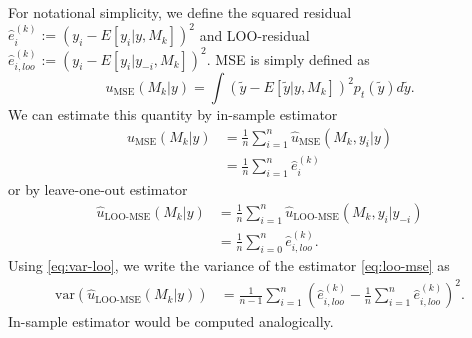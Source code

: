 \documentclass{article}
\newcommand{\residual}[2][i]{\hat{e}_{#1}^{(#2)}}
\begin{document}
For notational simplicity, we define the squared residual $\residual{k} := (y_i - E[y_i | y, M_k])^2$ and LOO-residual $\residual[i, loo]{k} := (y_i - E[y_i | y_{-i}, M_k])^2$. MSE is simply defined as
\begin{equation}
    u_{\text{MSE}}(M_k | y) = \int \left( \tilde{y} - E\left[ \tilde{y} | y, M_k \right] \right)^2 p_t(\tilde{y}) d\tilde{y}.
\end{equation}
We can estimate this quantity by in-sample estimator
\begin{align}
    \hat{u}_{\text{MSE}}(M_k | y) &= \frac{1}{n} \sum_{i=1}^n \hat{u}_{\text{MSE}}(M_k, y_i | y) \nonumber \\ 
    &= \frac{1}{n} \sum_{i=1}^n \residual{k}
\end{align}
or by leave-one-out estimator
\begin{align}
    \hat{u}_{\text{LOO-MSE}}(M_k | y) &=\frac{1}{n} \sum_{i=1}^n \hat{u}_{\text{LOO-MSE}}(M_k, y_i | y_{-i}) \nonumber \\
    &=\frac{1}{n} \sum_{i=0}^n \residual[i,loo]{k}. \label{eq:loo-mse}
\end{align}
Using \eqref{eq:var-loo}, we write the variance of the estimator \eqref{eq:loo-mse} as
\begin{align}
    \widehat{\text{var}}\left( \hat{u}_{\text{LOO-MSE}}(M_k | y) \right) &= \frac{1}{n-1} \sum_{i = 1}^n \left( \residual[i, loo]{k} -  \frac{1}{n} \sum_{i=1}^n \residual[i, loo]{k} \right)^2 \label{eq:var-loo-mse}.
\end{align}
In-sample estimator would be computed analogically. 

\end{document}
